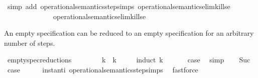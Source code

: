 \begin{isabellebody}
%
\isadelimproof
%
\endisadelimproof
%
\isatagproof
{}\isamarkupfalse%
\ {\isacharparenleft}simp\ add{\isacharcolon}\ operational{\isacharunderscore}semantics{\isacharunderscore}step{\isachardot}simps\ operational{\isacharunderscore}semantics{\isacharunderscore}elim{\isachardot}kills{\isacharunderscore}e{}\isanewline
\ \ \ \ \ \ \ \ \ \ \ \ \ \ operational{\isacharunderscore}semantics{\isacharunderscore}elim{\isachardot}kills{\isacharunderscore}e{}{\isacharparenright}%
\endisatagproof
{\isafoldproof}%
%
\isadelimproof
%
\endisadelimproof
%
\begin{isamarkuptext}%
An empty specification can be reduced to an empty specification for 
  an arbitrary number of steps.%
\end{isamarkuptext}\isamarkuptrue%
\isamarkupfalse%
\ empty{\isacharunderscore}spec{\isacharunderscore}reductions{\isacharcolon}\isanewline
\ \ {\isacartoucheopen}{\isacharparenleft}{\isacharbrackleft}{\isacharbrackright}{\isacharcomma}\ {}\ {\isasymturnstile}\ {\isacharbrackleft}{\isacharbrackright}\ {\isasymtriangleright}\ {\isacharbrackleft}{\isacharbrackright}{\isacharparenright}\ {\isasymhookrightarrow}\isactrlbsup k\isactrlesup \ {\isacharparenleft}{\isacharbrackleft}{\isacharbrackright}{\isacharcomma}\ k\ {\isasymturnstile}\ {\isacharbrackleft}{\isacharbrackright}\ {\isasymtriangleright}\ {\isacharbrackleft}{\isacharbrackright}{\isacharparenright}{\isacartoucheclose}\isanewline
%
\isadelimproof
%
\endisadelimproof
%
\isatagproof
{}\isamarkupfalse%
\ {\isacharparenleft}induct\ k{\isacharparenright}\isanewline
\ \ \isamarkupfalse%
\ {}\ \isamarkupfalse%
\ {\isacharquery}case\ \isamarkupfalse%
\ simp\isanewline
{}\isamarkupfalse%
\isanewline
\ \ \isamarkupfalse%
\ Suc\ \isamarkupfalse%
\ {\isacharquery}case\isanewline
\ \ \ \ \isamarkupfalse%
\ instant{\isacharunderscore}i\ operational{\isacharunderscore}semantics{\isacharunderscore}step{\isachardot}simps\ \isamarkupfalse%
\ fastforce\ \isanewline
{}\isamarkupfalse%
%
\endisatagproof
{\isafoldproof}%
%
\isadelimproof
\isanewline
%
\endisadelimproof
%
\isadelimtheory
\isanewline
%
\endisadelimtheory
%
\isatagtheory
{}\isamarkupfalse%
%
\endisatagtheory
{\isafoldtheory}%
%
\isadelimtheory
%
\endisadelimtheory
%
\end{isabellebody}%
\endinput
